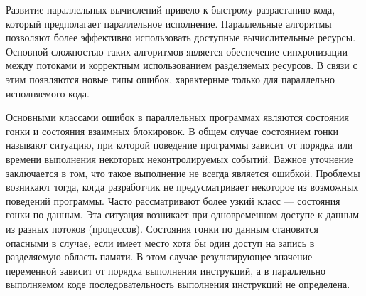 
Развитие параллельных вычислений привело к быстрому разрастанию кода, который предполагает параллельное исполнение.
Параллельные алгоритмы позволяют более эффективно использовать доступные вычислительные ресурсы.
Основной сложностью таких алгоритмов является обеспечение синхронизации между потоками и корректным использованием разделяемых ресурсов.
В связи с этим появляются новые типы ошибок, характерные только для параллельно исполняемого кода. 

Основными классами ошибок в параллельных программах являются состояния гонки и состояния взаимных блокировок.
В общем случае состоянием гонки называют ситуацию, при которой поведение программы зависит от порядка или времени выполнения некоторых неконтролируемых событий.
Важное уточнение заключается в том, что такое выполнение не всегда является ошибкой.
Проблемы возникают тогда, когда разработчик не предусматривает некоторое из возможных поведений программы.
Часто рассматривают более узкий класс — состояния гонки по данным. Эта ситуация возникает при одновременном доступе к данным из разных потоков (процессов).
Состояния гонки по данным становятся опасными в случае, если имеет место хотя бы один доступ на запись в разделяемую область памяти.
В этом случае результирующее значение переменной зависит от порядка выполнения инструкций, а в параллельно выполняемом коде последовательность выполнения инструкций не определена. 

 
